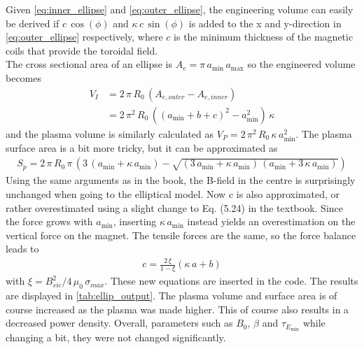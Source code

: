 Given \cref{eq:inner_ellipse} and \cref{eq:outer_ellipse}, the engineering volume can easily be derived if $c\,\cos(\phi)$ and $\kappa\, c\,\sin(\phi)$ is added to the x and y-direction in \cref{eq:outer_ellipse} respectively, where $c$ is the minimum thickness of the magnetic coils that provide the toroidal field. \\
The cross sectional area of an ellipse is $A_{\si{e}}=\pi\, a_{\min}\, a_{\max}$ so the engineered volume becomes
\begin{align}
	V_{\si{I}} & =2\,\pi\, R_{0}\,(A_{\si{e,outer}}-A_{\si{e,inner}}) \nonumber                        \\
	           & = 2\,\pi^{2}\, R_{0}\,\left(\left(a_{\min}+b+c\right)^{2}-a_{\min}^{2}\right)\,\kappa
	\label{eq:engineered_volume}
\end{align}
and the plasma volume is similarly calculated as $V_{\si{P}}=2\,\pi^2\, R_{0}\,\kappa\, a_{\min}^{2}$. The plasma surface area is a bit more tricky, but it can be approximated as
\begin{align}
	S_{\si{p}}=2\,\pi\, R_{0}\,\pi\,(3\,(a_{\min}+\kappa\, a_{\min})-\sqrt{(3\, a_{\min}+\kappa\, a_{\min})\,(a_{\min}+3\,\kappa\, a_{\min})})
\end{align}
Using the same arguments as in the book, the B-field in the centre is surprisingly unchanged when going to the elliptical model. Now c is also approximated, or rather overestimated using a slight change to Eq. (5.24) in the textbook. Since the force grows with $a_{\min}$, inserting $\kappa\, a_{\min}$ instead yields an overestimation on the vertical force on the magnet. The tensile forces are the same, so the force balance leads to
\begin{align}
	c=\frac{2\,\xi}{1-\xi}(\kappa\, a+b)
\end{align}
with $\xi=B_{si{c}}^2/4\,\mu_{0}\,\sigma_{\si{max}}$. These new equations are inserted in the code. The results are displayed in \ref{tab:ellip_output}. The plasma volume and surface area is of course increased as the plasma was made higher. This of course also results in a decreased power density. Overall, parameters such as $B_{0}$, $\beta$ and $\tau_{\si{E_{\min}}}$ while changing a bit, they were not changed significantly.
